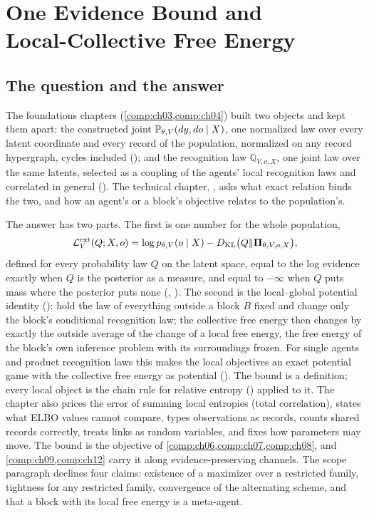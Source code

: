 \chapter[One Evidence Bound and Local-Collective Free Energy]{One Evidence Bound and\\Local-Collective Free Energy}
\label{comp:ch05}

\section{The question and the answer}
\label{comp:ch05-question}

The foundations chapters (\cref{comp:ch03,comp:ch04}) built two objects and kept them apart:
the constructed joint $\mathbb P_{\theta,V}(dy,do\mid X)$, one normalized law over every
latent coordinate and every record of the population, normalized on any record hypergraph,
cycles included (); and the recognition law
$\mathbb Q_{V,o,X}$, one joint law over the same latents, selected as a coupling of the
agents' local recognition laws and correlated in general
(). The technical chapter, , asks what
exact relation binds the two, and how an agent's or a block's objective relates to the
population's.

The answer has two parts. The first is one number for the whole population,
\[
\mathcal L^{\mathrm{ext}}_V(Q;X,o)=\log p_{\theta,V}(o\mid X)-D_{\mathrm{KL}}\bigl(Q\Vert\boldsymbol\Pi_{\theta,V,o,X}\bigr),
\]
defined for every probability law $Q$ on the latent space, equal to the log evidence exactly
when $Q$ is the posterior as a measure, and equal to $-\infty$ when $Q$ puts mass where the
posterior puts none (, ). The second is the
local--global potential identity (): hold the law of
everything outside a block $B$ fixed and change only the block's conditional recognition law;
the collective free energy then changes by exactly the outside average of the change of a local
free energy, the free energy of the block's own inference problem with its surroundings frozen.
For single agents and product recognition laws this makes the local objectives an exact
potential game with the collective free energy as potential (). The
bound is a definition; every local object is the chain rule for relative entropy
() applied to it. The chapter also prices the error of summing local entropies (total correlation),
states what ELBO values cannot compare, types observations as records, counts shared records
correctly, treats links as random variables, and fixes how parameters may move. The bound is the
objective of \cref{comp:ch06,comp:ch07,comp:ch08}, and \cref{comp:ch09,comp:ch12} carry it along
evidence-preserving channels. The scope paragraph declines four claims: existence of a maximizer
over a restricted family, tightness for any restricted family, convergence of the alternating
scheme, and that a block with its local free energy is a meta-agent.

